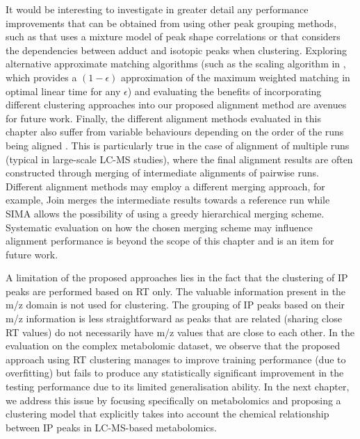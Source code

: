 It would be interesting to investigate in greater detail any performance improvements that can be obtained from using other peak grouping methods, such as \cite{Rogers2012} that uses a mixture model of peak shape correlations or \cite{Daly2014} that considers the dependencies between adduct and isotopic peaks when clustering. Exploring alternative approximate matching algorithms (such as the scaling algorithm in \cite{Maximum2011}, which provides a $(1-\epsilon)$ approximation of the maximum weighted matching in optimal linear time for any $\epsilon$) and evaluating the benefits of incorporating different clustering approaches into our proposed alignment method are avenues for future work. Finally, the different alignment methods evaluated in this chapter also suffer from variable behaviours depending on the order of the runs being aligned \cite{Smith2014}. This is particularly true in the case of alignment of multiple runs (typical in large-scale LC-MS studies), where the final alignment results are often constructed through merging of intermediate alignments of pairwise runs. Different alignment methods may employ a different merging approach, for example, Join merges the intermediate results towards a reference run while SIMA allows the possibility of using a greedy hierarchical merging scheme. Systematic evaluation on how the chosen merging scheme may influence alignment performance is beyond the scope of this chapter and is an item for future work.

A limitation of the proposed approaches lies in the fact that the clustering of IP peaks are performed based on RT only. The valuable information present in the m/z domain is not used for clustering. The grouping of IP peaks based on their m/z information is less straightforward as peaks that are related (sharing close RT values) do not necessarily have m/z values that are close to each other. In the evaluation on the complex metabolomic dataset, we observe that the proposed approach using RT clustering manages to improve training performance (due to overfitting) but fails to produce any statistically significant improvement in the testing performance due to its limited generalisation ability. In the next chapter, we address this issue by focusing specifically on metabolomics and proposing a clustering model that explicitly takes into account the chemical relationship between IP peaks in LC-MS-based metabolomics. 
